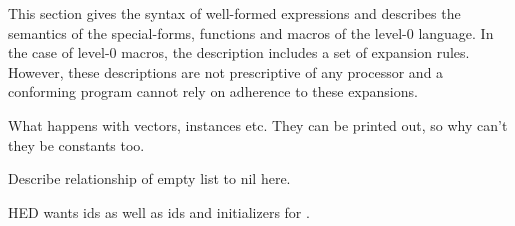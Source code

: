 %
\label{control-0}
%
\begin{optDefinition}
\noindent
This section gives the syntax of well-formed expressions and describes the
semantics of the special-forms, functions and macros of the level-0 language.
In the case of level-0 macros, the description includes a set of expansion
rules.  However, these descriptions are not prescriptive of any processor and a
conforming program cannot rely on adherence to these expansions.
\end{optDefinition}

%
\begin{optPrivate}
    What happens with vectors, instances etc.  They can be printed out, so why
    can't they be constants too.

    Describe relationship of empty list to nil here.

    HED wants ids as well as ids and initializers for .
\end{optPrivate}
%
